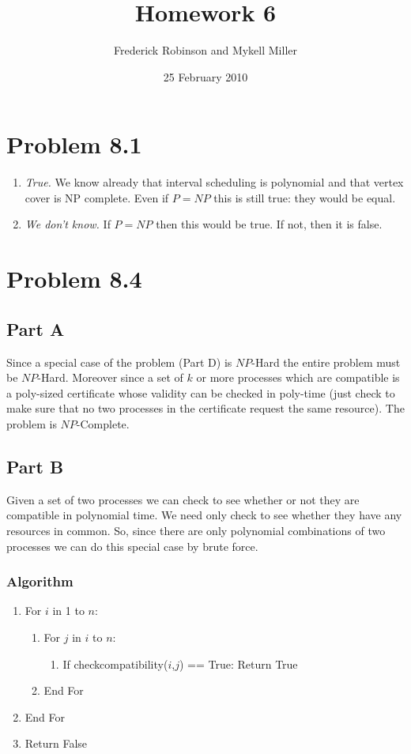 \documentclass{article}
\title{Homework 6}
\author{Frederick Robinson and Mykell Miller}
\date{25 February 2010}
\begin{document}

   \maketitle



\section{Problem 8.1}

\begin{enumerate}
\item \emph{True.} We know already that interval scheduling is polynomial and that vertex cover is NP complete. Even if $P=NP$ this is still true: they would be equal.
\item \emph{We don't know.} If $P=NP$ then this would be true. If not, then it is false.
\end{enumerate}
\section{Problem 8.4}
\subsection{Part A}
Since a special case of the problem (Part D) is $NP$-Hard the entire problem must be $NP$-Hard. Moreover since a set of $k$ or more processes which are compatible is a poly-sized certificate whose validity can be checked in poly-time (just check to make sure that no two processes in the certificate request the same resource). The problem is $NP$-Complete.
\subsection{Part B}
Given a set of two processes we can check to see whether or not they are compatible in polynomial time. We need only check to see whether they have any resources in common. So, since there are only polynomial combinations of two processes we can do this special case by brute force.

\subsubsection{Algorithm}




\begin{enumerate}
\item For $i$ in 1 to $n$:
\begin{enumerate}
\item For $j$ in $i$ to $n$:
\begin{enumerate}
\item If checkcompatibility($i$,$j$) == True: Return True
\end{enumerate}
\item End For
\end{enumerate}
\item End For
\item Return False
\end{enumerate}
\end{document}
